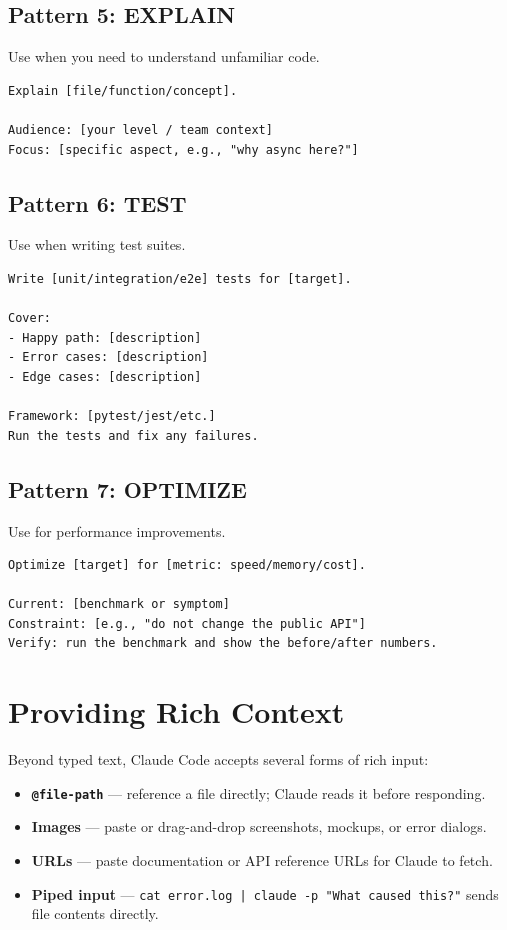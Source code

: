 \subsection{Pattern 5: EXPLAIN}

Use when you need to understand unfamiliar code.

\begin{lstlisting}[caption={EXPLAIN pattern template}]
Explain [file/function/concept].

Audience: [your level / team context]
Focus: [specific aspect, e.g., "why async here?"]
\end{lstlisting}

\subsection{Pattern 6: TEST}

Use when writing test suites.

\begin{lstlisting}[caption={TEST pattern template}]
Write [unit/integration/e2e] tests for [target].

Cover:
- Happy path: [description]
- Error cases: [description]
- Edge cases: [description]

Framework: [pytest/jest/etc.]
Run the tests and fix any failures.
\end{lstlisting}

\subsection{Pattern 7: OPTIMIZE}

Use for performance improvements.

\begin{lstlisting}[caption={OPTIMIZE pattern template}]
Optimize [target] for [metric: speed/memory/cost].

Current: [benchmark or symptom]
Constraint: [e.g., "do not change the public API"]
Verify: run the benchmark and show the before/after numbers.
\end{lstlisting}

\section{Providing Rich Context}
\label{sec:rich-context}

Beyond typed text, Claude Code accepts several forms of rich input:

\begin{itemize}
  \item \textbf{\texttt{@file-path}} — reference a file directly; Claude reads
        it before responding.
  \item \textbf{Images} — paste or drag-and-drop screenshots, mockups, or
        error dialogs.
  \item \textbf{URLs} — paste documentation or API reference URLs for Claude
        to fetch.
  \item \textbf{Piped input} —
        \texttt{cat error.log | claude -p "What caused this?"} sends file
        contents directly.
\end{itemize}

